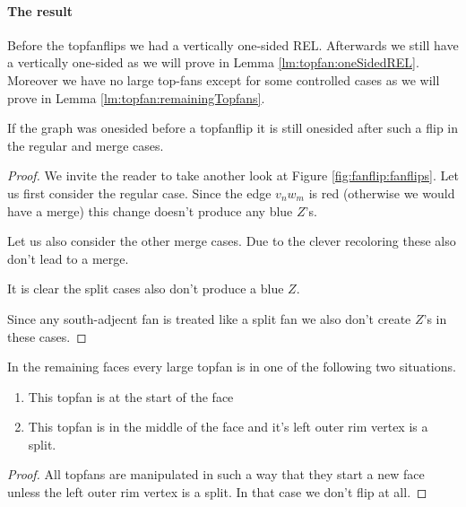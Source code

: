 \paragraph{The result}
Before the topfanflips we had a vertically one-sided REL. Afterwards we still have a vertically one-sided \rel as we will prove in Lemma \ref{lm:topfan:oneSidedREL}. Moreover we have no large top-fans except for some controlled cases as we will prove in Lemma \ref{lm:topfan:remainingTopfans}.

\begin{lemma}
  \label{lm:topfan:oneSidedREL}
  If the graph was onesided before a topfanflip it is still onesided after such a flip in the regular and merge cases.
\end{lemma}
\begin{proof}
  We invite the reader to take another look at Figure \ref{fig:fanflip:fanflips}.
  Let us first consider the regular case. Since the edge  $v_n w_m$ is red (otherwise we would have a merge) this change doesn't produce any blue $Z$'s.

  Let us also consider the other merge cases. Due to the clever recoloring these also don't lead to a merge.

  It is clear the split cases also don't produce a blue $Z$.

  Since any south-adjecnt fan is treated like a split fan we also don't create $Z$'s  in these cases.
\end{proof}


\begin{lemma}
  \label{lm:topfan:remainingTopfans}
  In the remaining faces every large topfan is in one of the following two situations.
  \begin{enumerate}
    \item  This topfan is at the start of the face
    \item  This topfan is in the middle of the face and it's left outer rim vertex is a split.
  \end{enumerate}
\end{lemma}
\begin{proof}
  All topfans are manipulated in such a way that they start a new face unless the left outer rim vertex is a split. In that case we don't flip at all.
\end{proof}
